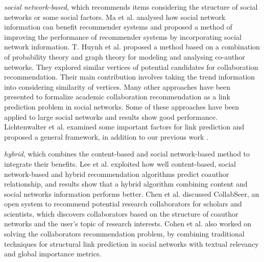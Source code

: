 \documentclass[review]{elsarticle}
\begin{document}
\emph{social network-based}, which recommends items considering the structure of social networks or some social factors. Ma et al. \cite{ma2011recommender} analysed how social network information can benefit recommender systems and proposed a method of improving the performance of recommender systems by incorporating social network information. T. Huynh et al. \cite{huynh2013trend} proposed a method based on a combination of probability theory and graph theory for modeling and analysing co-author networks. They explored similar vertices of potential candidates for collaboration recommendation. Their main contribution involves taking the trend information into considering similarity of vertices. Many other approaches have been presented to formalize academic collaboration recommendation as a link prediction problem \cite{chen2012discovering} \cite{sun2011co} in social networks. Some of these approaches have been applied to large social networks and results show good performance. Lichtenwalter et al. \cite{lichtenwalter2010new} examined some important factors for link prediction and proposed a general framework, in addition to our previous work \cite{li2014acrec}.

\emph{hybrid}, which combines the content-based and social network-based method to integrate their benefits. Lee et al. \cite{lee2011recommending} exploited how well content-based, social network-based and hybrid recommendation algorithms predict coauthor relationship, and results show that a hybrid algorithm combining content and social networks information performs better. Chen et al. \cite{chen2011collabseer} discussed CollabSeer, an open system to recommend potential research collaborators for scholars and scientists, which discovers collaborators based on the structure of coauthor networks and the user's topic of research interests. Cohen et al. \cite{cohen2013recommending} also worked on solving the collaborators recommendation problem, by combining traditional techniques for structural link prediction in social networks with textual relevancy and global importance metrics.

\end{document}
